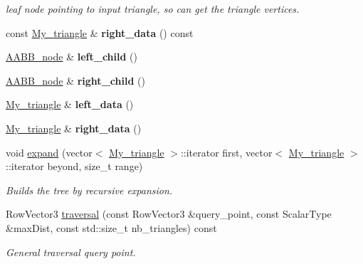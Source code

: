 \begin{DoxyCompactItemize}
\begin{DoxyCompactList}\small\item\em leaf node pointing to input triangle, so can get the triangle vertices. \end{DoxyCompactList}\item 
const \hyperlink{struct_my__triangle}{My\+\_\+triangle} \& {\bfseries right\+\_\+data} () const \hypertarget{class_a_a_b_b__node_ab4002a5a9e8878cb5cfff48c23fd91a8}{}\label{class_a_a_b_b__node_ab4002a5a9e8878cb5cfff48c23fd91a8}

\item 
\hyperlink{class_a_a_b_b__node}{A\+A\+B\+B\+\_\+node} \& {\bfseries left\+\_\+child} ()\hypertarget{class_a_a_b_b__node_aaf4a4b9ebfd1faea90dd6430d5c5069f}{}\label{class_a_a_b_b__node_aaf4a4b9ebfd1faea90dd6430d5c5069f}

\item 
\hyperlink{class_a_a_b_b__node}{A\+A\+B\+B\+\_\+node} \& {\bfseries right\+\_\+child} ()\hypertarget{class_a_a_b_b__node_a55be4a4b0a9e508df2c54df3b4ac68f7}{}\label{class_a_a_b_b__node_a55be4a4b0a9e508df2c54df3b4ac68f7}

\item 
\hyperlink{struct_my__triangle}{My\+\_\+triangle} \& {\bfseries left\+\_\+data} ()\hypertarget{class_a_a_b_b__node_ab311d82312a960ee429a56e4e42efa0d}{}\label{class_a_a_b_b__node_ab311d82312a960ee429a56e4e42efa0d}

\item 
\hyperlink{struct_my__triangle}{My\+\_\+triangle} \& {\bfseries right\+\_\+data} ()\hypertarget{class_a_a_b_b__node_a9fa766333099834078112f05a43247f6}{}\label{class_a_a_b_b__node_a9fa766333099834078112f05a43247f6}

\item 
void \hyperlink{class_a_a_b_b__node_a795f0ae58059d7ebd69978e81f1bcc6c}{expand} (vector$<$ \hyperlink{struct_my__triangle}{My\+\_\+triangle} $>$\+::iterator first, vector$<$ \hyperlink{struct_my__triangle}{My\+\_\+triangle} $>$\+::iterator beyond, size\+\_\+t range)
\begin{DoxyCompactList}\small\item\em Builds the tree by recursive expansion. \end{DoxyCompactList}\item 
Row\+Vector3 \hyperlink{class_a_a_b_b__node_a3522587d1fbf4b92af93d5d4b8838fb9}{traversal} (const Row\+Vector3 \&query\+\_\+point, const Scalar\+Type \&max\+Dist, const std\+::size\+\_\+t nb\+\_\+triangles) const 
\begin{DoxyCompactList}\small\item\em General traversal query point. \end{DoxyCompactList}\end{DoxyCompactItemize}



